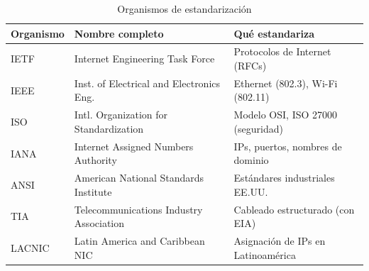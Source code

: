 \begin{table}[h!]
\centering
\renewcommand{\arraystretch}{1.3}
\begin{tabular}{lll}
\toprule
\textbf{Organismo} & \textbf{Nombre completo} & \textbf{Qué estandariza} \\
\midrule
IETF  & Internet Engineering Task Force          & Protocolos de Internet (RFCs) \\
IEEE  & Inst. of Electrical and Electronics Eng. & Ethernet (802.3), Wi-Fi (802.11) \\
ISO   & Intl. Organization for Standardization  & Modelo OSI, ISO 27000 (seguridad) \\
IANA  & Internet Assigned Numbers Authority      & IPs, puertos, nombres de dominio \\
ANSI  & American National Standards Institute    & Estándares industriales EE.UU. \\
TIA   & Telecommunications Industry Association  & Cableado estructurado (con EIA) \\
LACNIC & Latin America and Caribbean NIC        & Asignación de IPs en Latinoamérica \\
\bottomrule
\end{tabular}
\caption{Organismos de estandarización}
\end{table}
